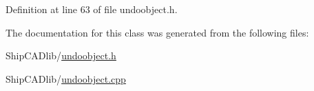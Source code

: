 Definition at line 63 of file undoobject.\+h.



The documentation for this class was generated from the following files\+:\begin{DoxyCompactItemize}
\item 
Ship\+C\+A\+Dlib/\hyperlink{undoobject_8h}{undoobject.\+h}\item 
Ship\+C\+A\+Dlib/\hyperlink{undoobject_8cpp}{undoobject.\+cpp}\end{DoxyCompactItemize}
